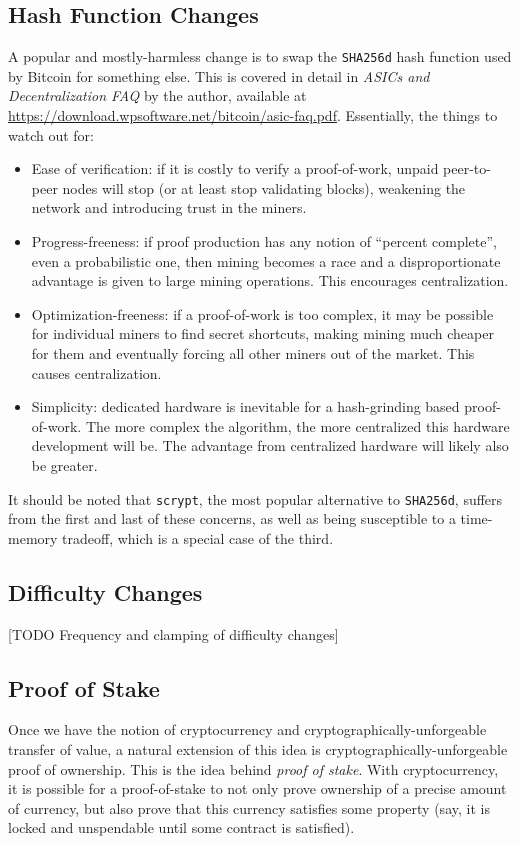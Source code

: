 \documentclass[letterpaper]{article}
\begin{document}
\subsection{Hash Function Changes}
A popular and mostly-harmless change is to
swap the \texttt{SHA256d} hash function used by Bitcoin for something else. This
is covered in detail in \emph{ASICs and Decentralization FAQ} by the author,
available at \url{https://download.wpsoftware.net/bitcoin/asic-faq.pdf}.
Essentially, the things to watch out for:
\begin{itemize}
\item Ease of verification: if it is costly to verify a proof-of-work, unpaid
peer-to-peer nodes will stop (or at least stop validating blocks), weakening
the network and introducing trust in the miners.
\item Progress-freeness: if proof production has any notion of ``percent
complete'', even a probabilistic one, then mining becomes a race and a disproportionate
advantage is given to large mining operations. This encourages centralization.
\item Optimization-freeness: if a proof-of-work is too complex, it may be possible
for individual miners to find secret shortcuts, making mining much cheaper for them
and eventually forcing all other miners out of the market. This causes centralization.
\item Simplicity: dedicated hardware is inevitable for a hash-grinding based
proof-of-work. The more complex the algorithm, the more centralized this hardware
development will be. The advantage from centralized hardware will likely also be
greater.
\end{itemize}
It should be noted that \texttt{scrypt}, the most popular alternative to
\texttt{SHA256d}, suffers from the first and last of these concerns, as
well as being susceptible to a time-memory tradeoff, which is a special
case of the third.

\subsection{Difficulty Changes}
[TODO Frequency and clamping of difficulty changes]

\subsection{Proof of Stake\label{secpos}}

Once we have the notion of cryptocurrency and cryptographically-unforgeable
transfer of value, a natural extension of this idea is cryptographically-unforgeable
proof of ownership. This is the idea behind \emph{proof of stake}. With cryptocurrency,
it is possible for a proof-of-stake to not only prove ownership of a precise
amount of currency, but also prove that this currency satisfies some property
(say, it is locked and unspendable until some contract is satisfied).
\end{document}
